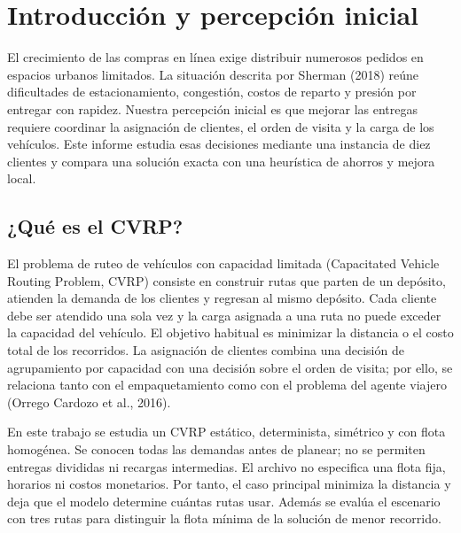 \documentclass[11pt,a4paper]{article}
\numberwithin{equation}{section}
\begin{document}

\setcounter{page}{2}


\Needspace{110pt}

\section{Introducción y percepción inicial}

El crecimiento de las compras en línea exige distribuir numerosos pedidos en espacios urbanos limitados. La situación descrita por Sherman (2018) reúne dificultades de estacionamiento, congestión, costos de reparto y presión por entregar con rapidez. Nuestra percepción inicial es que mejorar las entregas requiere coordinar la asignación de clientes, el orden de visita y la carga de los vehículos. Este informe estudia esas decisiones mediante una instancia de diez clientes y compara una solución exacta con una heurística de ahorros y mejora local.


\Needspace{110pt}

\subsection{¿Qué es el CVRP?}

El problema de ruteo de vehículos con capacidad limitada (Capacitated Vehicle Routing Problem, CVRP) consiste en construir rutas que parten de un depósito, atienden la demanda de los clientes y regresan al mismo depósito. Cada cliente debe ser atendido una sola vez y la carga asignada a una ruta no puede exceder la capacidad del vehículo. El objetivo habitual es minimizar la distancia o el costo total de los recorridos. La asignación de clientes combina una decisión de agrupamiento por capacidad con una decisión sobre el orden de visita; por ello, se relaciona tanto con el empaquetamiento como con el problema del agente viajero (Orrego Cardozo et al., 2016).


En este trabajo se estudia un CVRP estático, determinista, simétrico y con flota homogénea. Se conocen todas las demandas antes de planear; no se permiten entregas divididas ni recargas intermedias. El archivo no especifica una flota fija, horarios ni costos monetarios. Por tanto, el caso principal minimiza la distancia y deja que el modelo determine cuántas rutas usar. Además se evalúa el escenario con tres rutas para distinguir la flota mínima de la solución de menor recorrido.


\Needspace{110pt}
\end{document}
